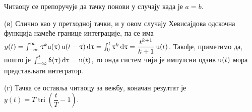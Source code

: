 Читаоцу се препоручује да тачку понови у случају када је $a=b$. 

(в) Слично као у претходној тачки, и у овом случају Хевисајдова одскочна функција намеће границе интеграције, па се има 
$y(t) = 
\int_{-\infty}^{\infty} \uptau^k {\rm u}(\uptau) \, {\rm u}(t-\uptau)  \, {\rm d} \uptau = 
\int_{0}^{t} \uptau^k \, {\rm d} \uptau = \dfrac{t^{k+1}}{k+1} \, {\rm u}(t)$.
Такође, приметимо да, пошто је $\int_{-\infty}^t \updelta(\uptau) \, {\rm d} \uptau = {\rm u}(t)$, то онда систем 
чији је импулсни одзив ${\rm u}(t)$ мора представљати интегратор. 


(г) Тачка се оставља читаоцу за вежбу, коначан резултат је 
$y(t) = T \operatorname{tri}\left( \dfrac tT - 1  \right)$.



